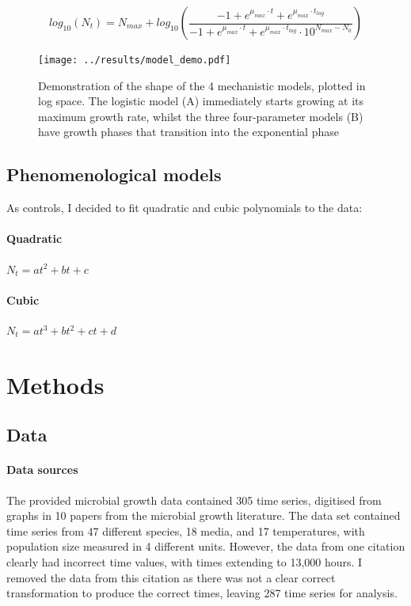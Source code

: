 \documentclass[11pt, a4paper]{article}
\begin{document}
\begin{linenumbers}
\[ log_{10}(N_t) = N_{max} + log_{10}(\frac{-1 + e^{\mu_{max} \cdot  t} + e^{\mu_{max} \cdot t_{lag}  } }{ -1 + e^{\mu_{max} \cdot t}  + e^{\mu_{max} \cdot t_{lag}} \cdot 10^{N_{max}-N_0}}) \]


        \begin{figure}[h]
        \texttt{[image: ../results/model\_demo.pdf]}
        \captionsetup{format=hang}
        \caption{Demonstration of the shape of the 4 mechanistic models, plotted in log space. The logistic model (A) immediately starts growing at its maximum growth rate, whilst the three four-parameter models (B) have growth phases that transition into the exponential phase}
        \label{fig:models_demo}
        \end{figure}

\subsection{Phenomenological models}
As controls, I decided to fit quadratic and cubic polynomials to the data:
\paragraph*{Quadratic} $ N_t = at^2 + bt + c $
\paragraph{Cubic} \quad \quad $ N_t = at^3 + bt^2 + ct + d $


   \section{Methods}
   
   \subsection{Data}
   
\paragraph{Data sources}
The provided microbial growth data contained 305 time series, digitised from graphs in 10 papers from the microbial growth literature. The data set contained time series from 47 different species, 18 media, and 17 temperatures, with population size measured in 4 different units. However, the data from one citation \cite{discarded} clearly had incorrect time values, with times extending to 13,000 hours. I removed the data from this citation as there was not a clear correct transformation to produce the correct times, leaving 287 time series for analysis.


\end{linenumbers}
\end{document}
